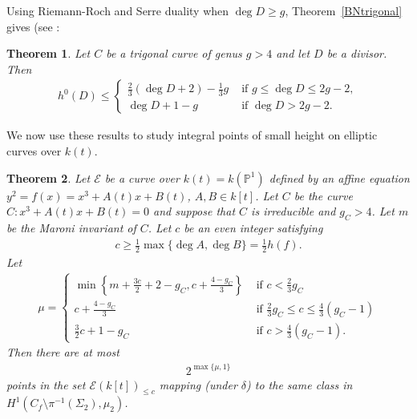 \documentclass[11pt]{article}
\theoremstyle{plain}
\newtheorem{theorem}{Theorem}[section]
\theoremstyle{definition}
\newcommand{\PP}{\mathbb{P}}
\begin{document}
Using Riemann-Roch and Serre duality when $\deg D\geq g$, Theorem~\ref{BNtrigonal} gives (see \cite[Remark~4.5(b)]{LN}:


\begin{theorem}
\label{h0trigonalbound}
Let $C$ be a trigonal curve of genus $g>4$ and let $D$ be a divisor. Then
\begin{align*}
h^0(D)\leq 
\begin{cases}
\frac{2}{3}(\deg D+2)-\frac{1}{3}g & \text{ if } g\leq \deg D\leq 2g-2,\\
\deg D+1-g & \text{ if } \deg D>2g-2.
\end{cases}
\end{align*} 
\end{theorem}

We now use these results to study integral points of small height on elliptic curves over $k(t)$.


\begin{theorem}
\label{generalMaronibound}
Let $\mathcal{E}$ be a curve over $k(t)=k(\PP^1)$ defined by an affine equation $y^2=f(x)=x^3+A(t)x+B(t)$, $A,B\in k[t]$. Let $C$ be the curve $C:x^3+A(t)x+B(t)=0$ and suppose that $C$ is irreducible and $g_C>4$. Let $m$ be the Maroni invariant of $C$. Let $c$ be an even integer satisfying
\begin{align*}
c\geq \frac{1}{2}\max\{\deg A,\deg B\}=\frac{1}{2}h(f).
\end{align*}
Let
\begin{align*}
\mu=
\begin{cases}
\min\left\{m+\frac{3c}{2}+2-g_C,c+\frac{4-g_C}{3}\right\} &\text{ if }c<\frac{2}{3}g_C\\
c+\frac{4-g_C}{3} &\text{ if }\frac{2}{3}g_C\leq c\leq \frac{4}{3}(g_C-1)\\
\frac{3}{2}c+1-g_C &\text{ if }c>\frac{4}{3}(g_C-1).
\end{cases}
\end{align*}
Then there are at most 
\begin{align*}
2^{\max\{\mu,1\}}
\end{align*}
points in the set $\mathcal{E}(k[t])_{\leq c}$ mapping (under $\delta$) to the same class in $H^1(C_f\setminus \pi^{-1}(\Sigma_2),\mu_2)$.
\end{theorem}
\end{document}
